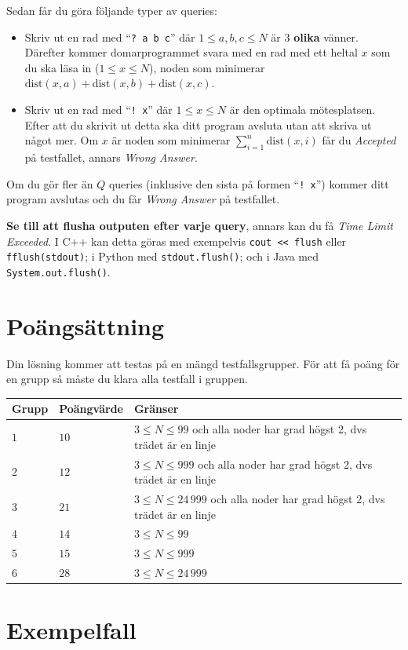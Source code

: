 Sedan får du göra följande typer av queries:
\begin{itemize}
    \item Skriv ut en rad med ``\verb|? a b c|'' där $1\le a,b,c\le N$ är $3$ \textbf{olika} vänner.
    Därefter kommer domarprogrammet svara med en rad med ett heltal $x$ som du ska läsa in
    ($1\le x\le N$), noden som minimerar $\text{dist}(x,a) +\text{dist}(x,b) +\text{dist}(x,c)$.
  \item Skriv ut en rad med ``\verb|! x|'' där $1\le x\le N$ är den optimala mötesplatsen.
    Efter att du skrivit ut detta ska ditt program avsluta utan att skriva ut något mer. 
    Om $x$ är noden som minimerar $\sum_{i=1}^{n} \text{dist}(x,i)$ får du \textit{Accepted} på testfallet, annars \textit{Wrong Answer}.
\end{itemize}
Om du gör fler än $Q$ queries (inklusive den sista på formen ``\verb|! x|'')
kommer ditt program avslutas och du får \textit{Wrong Answer} på testfallet.

\textbf{Se till att flusha outputen efter varje query}, annars kan du få \textit{Time Limit Exceeded}.
I C++ kan detta göras med exempelvis \texttt{cout << flush}
eller \texttt{fflush(stdout)};
i Python med \texttt{stdout.flush()};
och i Java med \texttt{System.out.flush()}.

\section*{Poängsättning}
Din lösning kommer att testas på en mängd testfallsgrupper.
För att få poäng för en grupp så måste du klara alla testfall i gruppen.


\noindent
\begin{tabular}{| l | l | l |}
  \hline
  Grupp & Poängvärde & Gränser \\ \hline \hline
  $1$   & $10$        & $3 \le N\le 99$ och alla noder har grad högst 2, dvs trädet är en linje \\ \hline
  $2$   & $12$        & $3 \le N\le 999$ och alla noder har grad högst 2, dvs trädet är en linje \\ \hline
  $3$   & $21$        & $3 \le N\le 24\,999$ och alla noder har grad högst 2, dvs trädet är en linje \\ \hline \hline
  $4$   & $14$        & $3 \le N\le 99$ \\ \hline
  $5$   & $15$        & $3 \le N\le 999$ \\ \hline
  $6$   & $28$        & $3 \le N\le 24\,999$ \\ \hline
\end{tabular}

\section*{Exempelfall}

